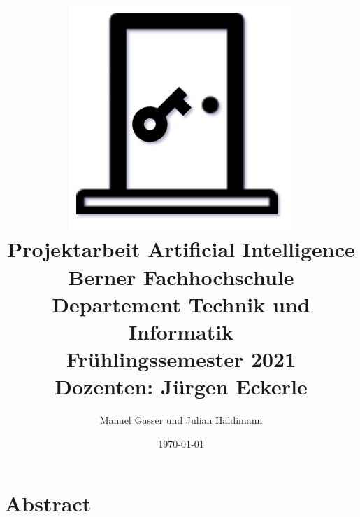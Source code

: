 \documentclass[12pt]{report}
\title{
    \includegraphics[scale=0.8]{content/pictures/front.png}\\
    \hfill \break
    {Projektarbeit Artificial Intelligence}\\
    {\large Berner Fachhochschule Departement Technik und Informatik}\\
    {\large Frühlingssemester 2021}\\
    {\large Dozenten: Jürgen Eckerle}\\
}
\author{Manuel Gasser und Julian Haldimann}
\date{\today}
\begin{document}
    \maketitle

    \chapter{Abstract}
    

    \tableofcontents
    
	
    
	

    \listoffigures
\end{document}

